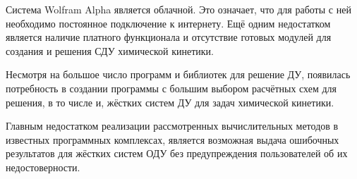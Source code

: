 Система Wolfram Alpha является облачной. Это означает, что для работы с ней необходимо постоянное подключение к интернету. Ещё
одним недостатком является наличие платного функционала и отсутствие готовых модулей для создания и решения СДУ химической кинетики.

Несмотря на большое число программ и библиотек для решение ДУ, появилась потребность в создании программы с большим выбором расчётных
схем для решения, в то числе и, жёстких систем ДУ для задач химической кинетики.

Главным недостатком реализации рассмотренных вычислительных методов в известных программных комплексах, является возможная выдача
ошибочных результатов
для жёстких систем ОДУ без предупреждения пользователей об их недостоверности.